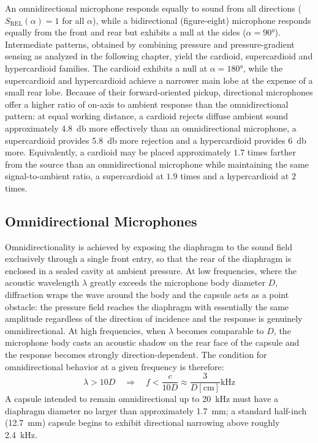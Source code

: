 An omnidirectional microphone responds equally to sound from all directions (\(S_{\mathrm{REL}}(\alpha) = 1\) for all \(\alpha\)), while a bidirectional (figure-eight) microphone responds equally from the front and rear but exhibits a null at the sides (\(\alpha = 90°\)).
Intermediate patterns, obtained by combining pressure and pressure-gradient sensing as analyzed in the following chapter, yield the cardioid, supercardioid and hypercardioid families.
The cardioid exhibits a null at \(\alpha = 180°\), while the supercardioid and hypercardioid achieve a narrower main lobe at the expense of a small rear lobe.
Because of their forward-oriented pickup, directional microphones offer a higher ratio of on-axis to ambient response than the omnidirectional pattern: at equal working distance, a cardioid rejects diffuse ambient sound approximately \SI{4.8}{\decibel} more effectively than an omnidirectional microphone, a supercardioid provides \SI{5.8}{\decibel} more rejection and a hypercardioid provides \SI{6}{\decibel} more.
Equivalently, a cardioid may be placed approximately \(1.7\) times farther from the source than an omnidirectional microphone while maintaining the same signal-to-ambient ratio, a supercardioid at \(1.9\) times and a hypercardioid at \(2\) times.

\subsection{Omnidirectional Microphones}

Omnidirectionality is achieved by exposing the diaphragm to the sound field exclusively through a single front entry, so that the rear of the diaphragm is enclosed in a sealed cavity at ambient pressure.
At low frequencies, where the acoustic wavelength \(\lambda\) greatly exceeds the microphone body diameter \(D\), diffraction wraps the wave around the body and the capsule acts as a point obstacle: the pressure field reaches the diaphragm with essentially the same amplitude regardless of the direction of incidence and the response is genuinely omnidirectional.
At high frequencies, when \(\lambda\) becomes comparable to \(D\), the microphone body casts an acoustic shadow on the rear face of the capsule and the response becomes strongly direction-dependent.
The condition for omnidirectional behavior at a given frequency is therefore:
\[
\lambda > 10 D \quad \Longrightarrow \quad f < \frac{c}{10 D} \approx \frac{3}{D [\mathrm{cm}]} \mathrm{kHz}
\]
A capsule intended to remain omnidirectional up to \SI{20}{\kilo\hertz} must have a diaphragm diameter no larger than approximately \SI{1.7}{\milli\meter}; a standard half-inch (\SI{12.7}{\milli\meter}) capsule begins to exhibit directional narrowing above roughly \SI{2.4}{\kilo\hertz}.

